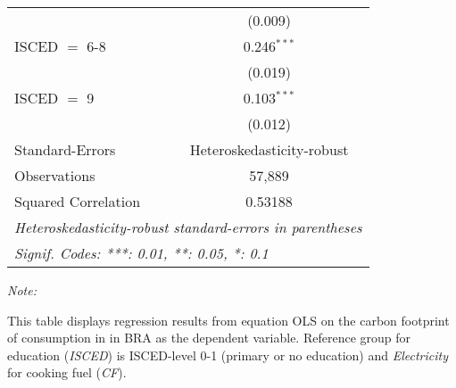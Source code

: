 \begin{table}[htbp!]
\begin{adjustbox}{width = 1\textwidth, max height = 0.95\textheight, center}
\begin{threeparttable}[b]
\begin{tabular}{lc}
                                & (0.009)\\   
            ISCED $=$ 6-8       & 0.246$^{***}$\\   
                                & (0.019)\\   
            ISCED $=$ 9         & 0.103$^{***}$\\   
                                & (0.012)\\   
            \midrule 
            Standard-Errors     & Heteroskedasticity-robust \\   
            Observations        & 57,889\\  
            Squared Correlation & 0.53188\\  
            \midrule \midrule
            \multicolumn{2}{l}{\emph{Heteroskedasticity-robust standard-errors in parentheses}}\\
            \multicolumn{2}{l}{\emph{Signif. Codes: ***: 0.01, **: 0.05, *: 0.1}}\\
         \end{tabular}
         
         \begin{tablenotes}\item \medskip \textit{Note:}
            \item This table displays regression results from equation OLS on the carbon footprint of consumption in  in BRA as the dependent variable.  Reference group for education (\textit{ISCED}) is ISCED-level 0-1 (primary or no education) and \textit{Electricity} for cooking fuel (\textit{CF}).
         \end{tablenotes}
      \end{threeparttable}
   \end{adjustbox}
\end{table}


